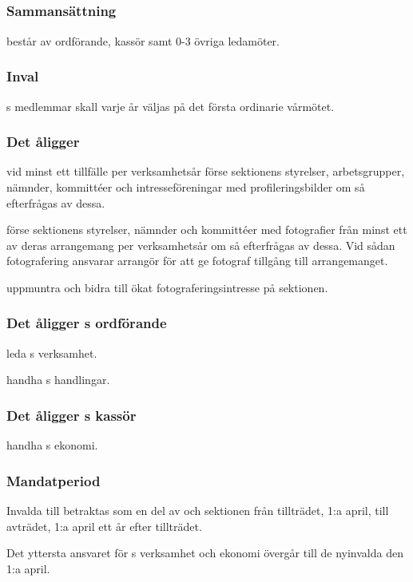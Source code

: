 \subsection{\FLASHITFULL}
\subsubsection{Sammansättning}
\FLASHIT{} består av ordförande, kassör samt 0-3 övriga ledamöter.

\subsubsection{Inval}
\FLASHIT{}s medlemmar skall varje år väljas på det första ordinarie vårmötet.

\subsubsection{Det åligger \FLASHIT}
\begin{att}
	\item vid minst ett tillfälle per verksamhetsår förse sektionens styrelser, arbetsgrupper, nämnder, kommittéer och intresseföreningar med profileringsbilder om så efterfrågas av dessa.
	\item förse sektionens styrelser, nämnder och kommittéer med fotografier från minst ett av deras arrangemang per verksamhetsår om så efterfrågas av dessa. Vid sådan fotografering ansvarar arrangör för att ge fotograf tillgång till arrangemanget.
	\item uppmuntra och bidra till ökat fotograferingsintresse på sektionen.
\end{att}

\subsubsection{Det åligger \FLASHIT{}s ordförande}
\begin{att}
	\item leda \FLASHIT{}s verksamhet.
	\item handha \FLASHIT{}s handlingar.
\end{att}

\subsubsection{Det åligger \FLASHIT{}s kassör}
\begin{att}
	\item handha \FLASHIT{}s ekonomi.
\end{att}

\subsubsection{Mandatperiod}
Invalda till \FLASHIT{} betraktas som en del av \FLASHIT{} och sektionen från tillträdet, 1:a april, till avträdet, 1:a april ett år efter tillträdet.

Det yttersta ansvaret för \FLASHIT{}s verksamhet och ekonomi övergår till de nyinvalda den 1:a april.